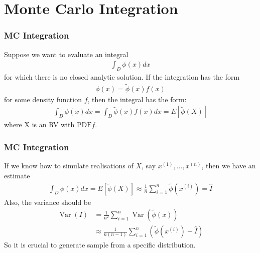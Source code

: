 \frame[plain]{\titlepage}


    
    
\section[MC Integration]{Monte Carlo Integration}
\begin{frame}
    \frametitle{MC Integration}
    Suppose we want to evaluate an integral
    \begin{align*}
    \int_D \phi(x) d x
    \end{align*}
    for which there is no closed analytic solution. If the integration has the form
    \begin{align*}
    \phi(x)=\tilde{\phi}(x) f(x)
    \end{align*}
    for some density function \(f\), then the integral has the form:
    \begin{align*}
    \int_D \phi(x) d x=\int_D \tilde{\phi}(x) f(x) d x=E[\tilde{\phi}(X)]
    \end{align*}
    where \(\mathrm{X}\) is an RV with \(\mathrm{PDF} f\). 

    

\end{frame}
\begin{frame}
    \frametitle{MC Integration}
    If we know how to simulate realisations of \(X\), say \(x^{(1)}, \ldots, x^{(n)}\), then we have an estimate
    \begin{align*}
    \int_D \phi(x) d x=E[\tilde{\phi}(X)] \approx \frac{1}{n} \sum_{i=1}^n \tilde{\phi}\left(x^{(i)}\right)=\hat{I}
    \end{align*}
    \pause
    Also, the variance should be
    \begin{align*}
        \operatorname{Var}(I) &= \frac{1}{n^2} \sum_{i=1}^n \operatorname{Var}\left(\tilde{\phi}\left(x\right)\right) \\
        &\approx \frac{1}{n(n-1)} \sum_{i=1}^n \left(\tilde{\phi}\left(x^{(i)}\right) - \hat I\right)
    \end{align*}
    So it is crucial to generate sample from a specific distribution.

    

\end{frame}
